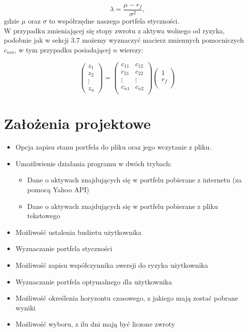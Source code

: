 \documentclass[magister]{dyplom}
\begin{document}
\begin{equation}
	\lambda = \frac{\mu - r_f}{{\sigma}^2},
\end{equation}
gdzie $\mu$ oraz $\sigma$ to współrzędne naszego portfela styczności.\\

W przypadku zmieniającej się stopy zwrotu z aktywa wolnego od ryzyka, podobnie jak w sekcji 3.7 możemy wyznaczyć macierz zmiennych pomocniczych $c_{nm}$, w tym przypadku posiadającej $n$ wierszy:

\begin{equation}
	\left( \begin{array}{c}
		z_1\\
		z_2\\
		\vdots\\
		z_n
	\end{array} \right) = 
	\left( \begin{array}{cc}
		c_{11}& c_{12}\\
		c_{21}& c_{22}\\
		\vdots& \vdots\\
		c_{n1}& c_{n2}\\
	\end{array} \right)
	\left( \begin{array}{c}
		1\\
		r_f\\
	\end{array} \right)
\end{equation}

\chapter{Założenia projektowe}

\begin{itemize}
	\item Opcja zapisu stanu portfela do pliku oraz jego wczytanie z pliku.
	\item Umożliwienie działania programu w dwóch trybach:
	\begin{itemize}
		\item Dane o aktywach znajdujących się w portfelu pobierane z internetu (za pomocą Yahoo API)
		\item Dane o aktywach znajdujących się w portfelu pobierane z pliku tekstowego
	\end{itemize}
	\item Możliwość ustalenia budżetu użytkownika
	\item Wyznaczanie portfela styczności
	\item Możliwość zapisu współczynnika awersji do ryzyka użytkownika
	\item Wyznaczanie portfela optymalnego dla użytkownika
	\item Możliwość określenia horyzontu czasowego, z jakiego mają zostać pobrane wyniki
	\item Możliwość wyboru, z ilu dni mają być liczone zwroty
\end{itemize}
\end{document}
